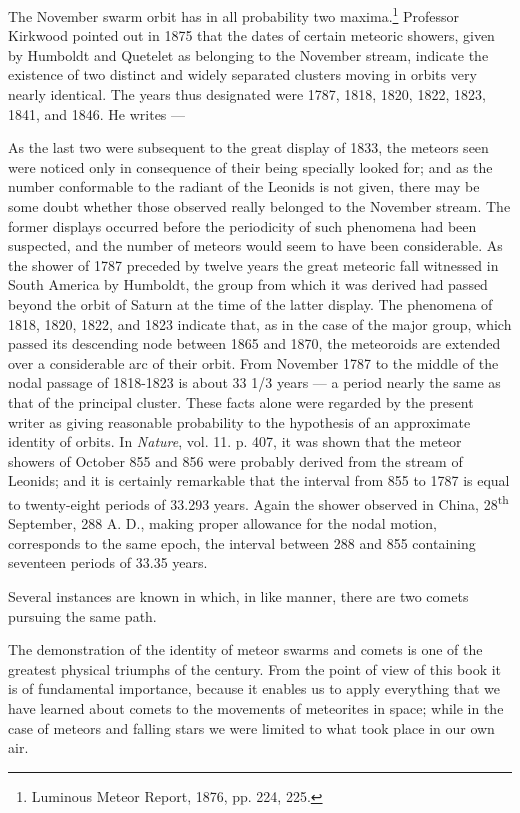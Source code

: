 \documentclass[a4paper, 12pt, oneside, polutonikogreek, english]{article}
\begin{document}
The November swarm orbit has in all probability two maxima.\footnote{Luminous Meteor Report, 1876, pp. 224, 225.} Professor Kirkwood pointed out in 1875 that the dates of certain meteoric showers, given by Humboldt and Quetelet as belonging to the November stream, indicate the existence of two distinct and widely separated clusters moving in orbits very nearly identical. The years thus designated were 1787, 1818, 1820, 1822, 1823, 1841, and 1846. He writes ---

As the last two were subsequent to the great display of 1833, the meteors seen were noticed only in consequence of their being specially looked for; and as the number conformable to the radiant of the Leonids is not given, there may be some doubt whether those observed really belonged to the November stream. The former displays occurred before the periodicity of such phenomena had been suspected, and the number of meteors would seem to have been considerable. As the shower of 1787 preceded by twelve years the great meteoric fall witnessed in South America by Humboldt, the group from which it was derived had passed beyond the orbit of Saturn at the time of the latter display. The phenomena of 1818, 1820, 1822, and 1823 indicate that, as in the case of the major group, which passed its descending node between 1865 and 1870, the meteoroids are extended over a considerable arc of their orbit. From November 1787 to the middle of the nodal passage of 1818-1823 is about 33 1/3 years --- a period nearly the same as that of the principal cluster. These facts alone were regarded by the present writer as giving reasonable probability to the hypothesis of an approximate identity of orbits. In \emph{Nature}, vol. 11. p. 407, it was shown that the meteor showers of October 855 and 856 were probably derived from the stream of Leonids; and it is certainly remarkable that the interval from 855 to 1787 is equal to twenty-eight periods of 33.293 years. Again the shower observed in China, 28\textsuperscript{th} September, 288 A. D., making proper allowance for the nodal motion, corresponds to the same epoch, the interval between 288 and 855 containing seventeen periods of 33.35 years.

Several instances are known in which, in like manner, there are two comets pursuing the same path.

The demonstration of the identity of meteor swarms and comets is one of the greatest physical triumphs of the century. From the point of view of this book it is of fundamental importance, because it enables us to apply everything that we have learned about comets to the movements of meteorites in space; while in the case of meteors and falling stars we were limited to what took place in our own air.
\clearpage
\end{document}
